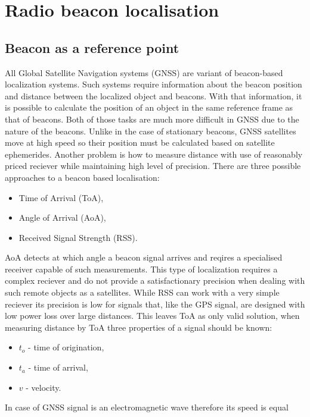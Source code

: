 \section{Radio beacon localisation}

\subsection{Beacon as a reference point}
All Global Satellite Navigation systems (GNSS) are variant of beacon-based localization
systems\cite{Blewitt1997}. Such systems require information about the beacon position
and distance between the localized object and beacons.
With that information, it is possible to calculate the position of an object in the same reference
frame as that of beacons.
Both of those tasks are much more difficult in GNSS due to the nature of the beacons.
Unlike in the case of stationary beacons, GNSS satellites move at high speed so
their position must be calculated based on satellite ephemerides.
Another problem is how to measure distance with use of reasonably priced reciever while 
maintaining high level of precision.
There are three possible approaches to a beacon based localisation:
\begin{itemize}
	\item Time of Arrival (ToA),
	\item Angle of Arrival (AoA),
	\item Received Signal Strength (RSS).
\end{itemize}
AoA detects at which angle a beacon signal arrives and reqires a specialised receiver capable 
of such measurements. This type of localization requires a complex reciever and do not provide 
a satisfactionary precision when dealing with such remote objects as a satellites.
While RSS can work with a very simple reciever its precision is low for signals that, like
the GPS signal, are designed with low power loss over large distances.
This leaves ToA as only valid solution, when measuring distance by ToA 
three properties of a signal should be known:
\begin{itemize}
	\item $t_o$ - time of origination,
	\item $t_a$ - time of arrival,
	\item $v$ - velocity.
\end{itemize}
In case of GNSS signal is an electromagnetic wave therefore its speed is equal
